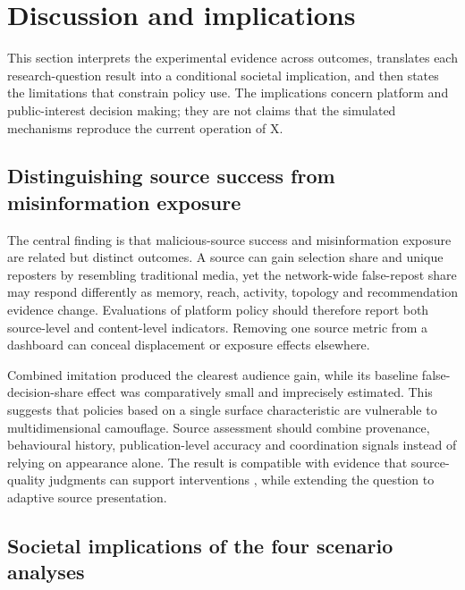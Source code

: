 \section{Discussion and implications}

This section interprets the experimental evidence across outcomes, translates each research-question result into a conditional societal implication, and then states the limitations that constrain policy use. The implications concern platform and public-interest decision making; they are not claims that the simulated mechanisms reproduce the current operation of X.

\subsection{Distinguishing source success from misinformation exposure}

The central finding is that malicious-source success and misinformation exposure are related but distinct outcomes. A source can gain selection share and unique reposters by resembling traditional media, yet the network-wide false-repost share may respond differently as memory, reach, activity, topology and recommendation evidence change. Evaluations of platform policy should therefore report both source-level and content-level indicators. Removing one source metric from a dashboard can conceal displacement or exposure effects elsewhere.

Combined imitation produced the clearest audience gain, while its baseline false-decision-share effect was comparatively small and imprecisely estimated. This suggests that policies based on a single surface characteristic are vulnerable to multidimensional camouflage. Source assessment should combine provenance, behavioural history, publication-level accuracy and coordination signals instead of relying on appearance alone. The result is compatible with evidence that source-quality judgments can support interventions \citep{pennycook2019}, while extending the question to adaptive source presentation.

\subsection{Societal implications of the four scenario analyses}

